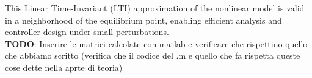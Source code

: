 \documentclass[]{report}
\begin{document}
This Linear Time-Invariant (LTI) approximation of the nonlinear model is valid in a neighborhood of the equilibrium point, enabling efficient analysis and controller design under small perturbations.\\

 
	
		
\textbf{TODO}: Inserire le matrici calcolate con matlab e verificare che rispettino quello che abbiamo scritto (verifica che il codice del .m e quello che fa rispetta queste cose dette nella aprte di teoria)		
		
		
		
	
	
	
	
\end{document}

